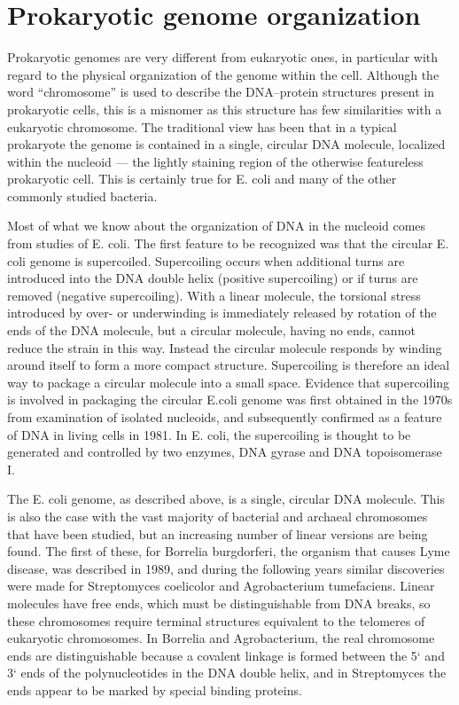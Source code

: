 \section{Prokaryotic genome organization}
Prokaryotic genomes are very different from eukaryotic ones, in particular with regard to the physical organization of the genome within the cell.
Although the word “chromosome” is used to describe the DNA–protein structures present in prokaryotic cells, this is a misnomer as this structure has few
similarities with a eukaryotic chromosome. 
The traditional view has been that in a typical prokaryote the genome is contained in a single, circular DNA molecule, 
localized within the nucleoid — the lightly staining region of the otherwise featureless prokaryotic cell. This is certainly true for E. coli and many of the other 
commonly studied bacteria.

Most of what we know about the organization of DNA in the nucleoid comes from studies of E. coli. The first feature to be recognized was that the circular
E. coli genome is supercoiled. Supercoiling occurs when additional turns are introduced into the DNA double helix (positive supercoiling) or if turns are
removed (negative supercoiling). With a linear molecule, the torsional stress introduced by over- or underwinding is immediately released by rotation of
the ends of the DNA molecule, but a circular molecule, having no ends, cannot reduce the strain in this way. Instead the circular molecule responds by
winding around itself to form a more compact structure. Supercoiling is therefore an ideal way to package a circular molecule into a small space. 
Evidence that supercoiling is involved in packaging the circular E.coli genome was first obtained in the 1970s from examination of isolated nucleoids, 
and subsequently confirmed as a feature of DNA in living cells in 1981. In E. coli, the supercoiling is thought to be generated and controlled by two enzymes, 
DNA gyrase and DNA topoisomerase I.

The E. coli genome, as described above, is a single, circular DNA molecule. This is also the case with the vast majority of bacterial and archaeal chromosomes 
that have been studied, but an increasing number of linear versions are being found. The first of these, for Borrelia burgdorferi, the organism that causes 
Lyme disease, was described in 1989, and during the following years similar discoveries were made for Streptomyces coelicolor and Agrobacterium tumefaciens. 
Linear molecules have free ends, which must be distinguishable from DNA breaks, so these chromosomes require terminal structures equivalent to the telomeres 
of eukaryotic chromosomes. In Borrelia and Agrobacterium, the real chromosome ends are distinguishable because a covalent linkage is formed 
between the 5` and 3` ends of the polynucleotides in the DNA double helix, and in Streptomyces the ends appear to be marked by special binding proteins.

